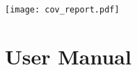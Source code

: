 \documentclass{article}
\begin{document}


\texttt{[image: cov\_report.pdf]}




\clearpage

\part*{User Manual}
{}
\appendix
\def\maketitle{}
\def\tableofcontents{}

\end{document}
